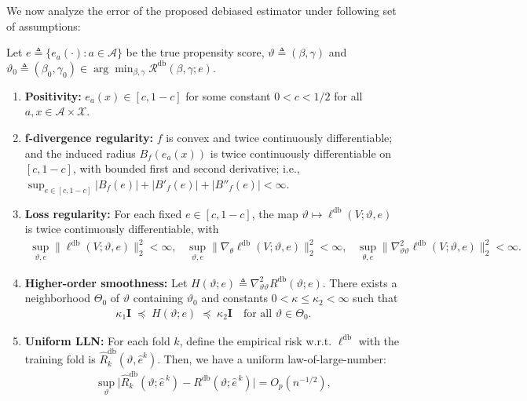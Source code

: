 We now analyze the error of the proposed debiased estimator under following set of assumptions: 
\begin{assumption}\label{assumption:regularity-condition}
    \normalfont
    Let $e \triangleq \{e_a(\cdot): a \in \mathcal{A}\}$ be the true propensity score, $\vartheta \triangleq (\beta,\gamma)$ and $\vartheta_0 \triangleq (\beta_0,\gamma_0) \in \arg\min_{\beta,\gamma} \mathcal{R}^{\mathrm{db}}(\beta,\gamma; e)$. 
    \begin{enumerate}[leftmargin=*]
        \item \textbf{Positivity:} $e_a(x) \in [c,1-c]$ for some constant $ 0< c  < 1/2$ for all $a,x \in \mathcal{A} \times \mathcal{X}$. 
        \item \textbf{f-divergence regularity:} $f$ is convex and twice continuously differentiable; and the induced radius $B_f(e_a(x))$ is twice continuously differentiable on $[c,1-c]$, with bounded first and second derivative; i.e., $\sup_{e \in [c,1-c]} |B_f(e)| + |B'_f(e)| + |B''_{f}(e)| < \infty $. 
        \item \textbf{Loss regularity:} For each fixed $e \in [c,1-c]$, the map $\vartheta \mapsto \ell^{\mathrm{db}}(V;\vartheta,e)$ is twice continuously differentiable, with 
        \begin{align*}
            \sup_{\vartheta,e} \|\ell^{\mathrm{db}}(V;\vartheta,e)\|^2_2 < \infty, \;\;\; \sup_{\vartheta,e} \|\nabla_\theta \ell^{\mathrm{db}}(V;\vartheta,e)\|^2_2 < \infty, \;\;\; \sup_{\theta,e}\|\nabla^2_{\vartheta\vartheta}\ell^{\mathrm{db}}(V;\vartheta,e)\|^2_2 < \infty.
        \end{align*}
        \item \textbf{Higher-order smoothness:} Let $H(\vartheta; e) \triangleq \nabla^{2}_{\vartheta\vartheta}R^{\mathrm{db}}(\vartheta; e)$. There exists a neighborhood $\varTheta_0$ of $\vartheta$ containing $\vartheta_0$ and constants $0 < \kappa \leq \kappa_2 < \infty$ such that 
        \begin{align}
            \kappa_1 \mathbf{I} \;\preceq\; H(\vartheta; e) \;\preceq\; \kappa_2 \mathbf{I} \quad\text{for all }\vartheta\in\varTheta_0.
        \end{align}
        \item \textbf{Uniform LLN:} For each fold $k$, define the empirical risk w.r.t. $\ell^{\mathrm{db}}$ with the training fold is $\widehat{R}^{\mathrm{db}}_k(\vartheta, \widehat{e}^k)$. Then, we have a uniform law-of-large-number:
        \begin{align}
            \sup_{\vartheta} \big| \widehat R_k^{\mathrm{db}}(\vartheta; \widehat e^{\,k}) - R^{\mathrm{db}}(\vartheta; \widehat e^{\,k}) \big| = O_p(n^{-1/2}),
        \end{align}
    \end{enumerate}
\end{assumption}

